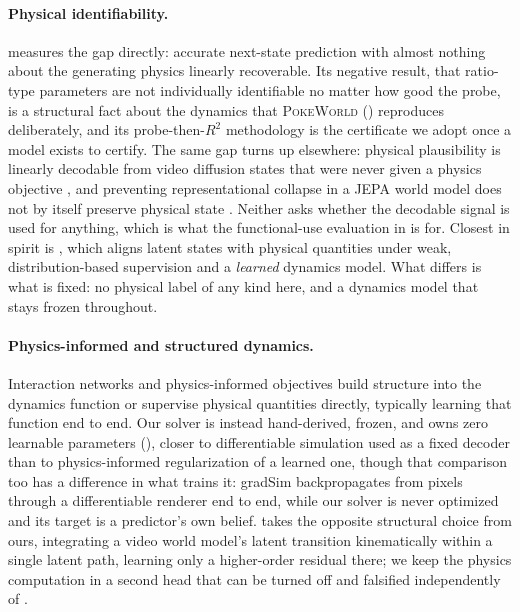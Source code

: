 \paragraph{Physical identifiability.}
\citet{latent-wm-identifiability} measures the gap directly: accurate
next-state prediction with almost nothing about the generating physics
linearly recoverable. Its negative result, that ratio-type parameters
are not individually identifiable no matter how good the probe, is a
structural fact about the dynamics that \textsc{PokeWorld}
() reproduces deliberately, and its
probe-then-$R^2$ methodology is the certificate we adopt once a model
exists to certify. The same gap turns up elsewhere: physical
plausibility is linearly decodable from video diffusion states that
were never given a physics objective \citep{esmati2026invisiblehand},
and preventing representational collapse in a JEPA world model does not
by itself preserve physical state \citep{zeng2026phylatent}. Neither
asks whether the decodable signal is used for anything, which is what
the functional-use evaluation in  is for.
Closest in spirit is \citet{mao2024piwm}, which aligns latent states
with physical quantities under weak, distribution-based supervision and
a \emph{learned} dynamics model. What differs is what is fixed: no
physical label of any kind here, and a dynamics model that stays frozen
throughout.

\paragraph{Physics-informed and structured dynamics.}
Interaction networks \citep{battaglia2016interaction} and
physics-informed objectives build structure into the dynamics function
or supervise physical quantities directly, typically learning that
function end to end. Our solver is instead hand-derived, frozen, and
owns zero learnable parameters (), closer to
differentiable simulation used as a fixed decoder
\citep{jatavallabhula2021gradsim} than to physics-informed
regularization of a learned one, though that comparison too has a
difference in what trains it: gradSim backpropagates from pixels
through a differentiable renderer end to end, while our solver is never
optimized and its target is a predictor's own belief. \citet{li2026ldr}
takes the opposite structural choice from ours, integrating a video
world model's latent transition kinematically within a single latent
path, learning only a higher-order residual there; we keep the physics
computation in a second head that can be turned off and falsified
independently of \pathA.

